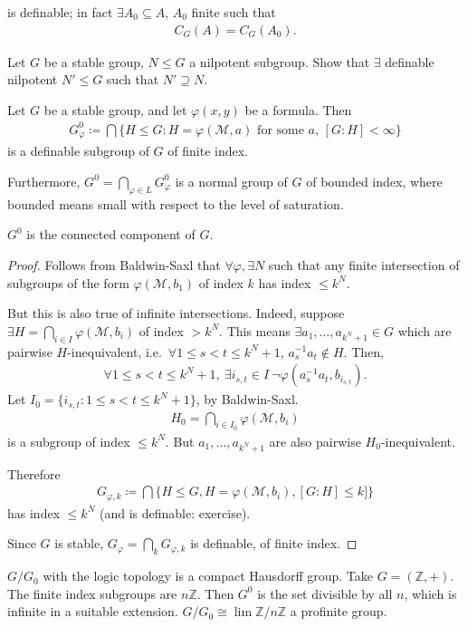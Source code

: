 \documentclass{article}
\begin{document}
is definable; in fact $\exists A_0 \subseteq A$, $A_0$ finite such that
\begin{align*}
  C_G(A) = C_G(A_0).
\end{align*}
\begin{ex}
  Let $G$ be a stable group, $N \leq G$ a nilpotent subgroup. Show that $\exists$ definable nilpotent $N' \leq G$ such that $N' \supseteq N$.
\end{ex}
\begin{cor}
  Let $G$ be a stable group, and let $\varphi(x,y)$ be a formula.
  Then
  \begin{align*}
    G_\varphi^0 \coloneqq \bigcap \{H \leq G : H = \varphi(\mathcal{M},a)\text{ for some $a$, $[G:H] < \infty$}\}
  \end{align*}
  is a definable subgroup of $G$ of finite index.

  Furthermore, $G^0 = \bigcap_{\varphi \in L} G_\varphi^0$ is a normal group of $G$ of bounded index, where bounded means small with respect to the level of saturation.

  $G^0$ is the connected component of $G$.
\end{cor}
\begin{proof}
  Follows from Baldwin-Saxl that $\forall \varphi, \exists N$ such that any finite intersection of subgroups of the form $\varphi(\mathcal{M},b_1)$ of index $k$ has index $\leq k^N$.

  But this is also true of infinite intersections.
  Indeed, suppose $\exists H = \bigcap_{i \in I} \varphi(\mathcal{M},b_i)$ of index $> k^N$.
  This means $\exists a_1, \dotsc, a_{k^N + 1} \in G$ which are pairwise $H$-inequivalent, i.e.\ $\forall 1 \leq s < t \leq k^N + 1$, $a_s^{-1} a_t \notin H$.
  Then,
  \begin{align*}
    \forall 1 \leq s < t \leq k^N + 1,\ \exists i_{s,t} \in I \ \neg\varphi(a_s^{-1} a_t, b_{i_{s,t}}).
  \end{align*}
  Let $I_0 = \{i_{s,t} : 1 \leq s < t \leq k^N + 1\}$, by Baldwin-Saxl.
  \begin{align*}
    H_0 = \bigcap_{i \in I_0} \varphi(\mathcal{M},b_i)
  \end{align*}
  is a subgroup of index $\leq k^N$.
  But $a_1, \dotsc, a_{k^N + 1}$ are also pairwise $H_0$-inequivalent.

  Therefore
  \begin{align*}
    G_{\varphi,k} \coloneqq \bigcap \{H \leq G, H = \varphi(\mathcal{M},b_i), [G:H] \leq k]\}
  \end{align*}
  has index $\leq k^N$ (and is definable: exercise).

  Since $G$ is stable,
  $G_\varphi = \bigcap_k G_{\varphi,k}$ is definable, of finite index.
\end{proof}
$G/G_0$ with the logic topology is a compact Hausdorff group.
Take $G = (\mathbb{Z},+)$. The finite index subgroups are $n \mathbb{Z}$. Then $G^0$ is the set divisible by all $n$, which is infinite in a suitable extension.
$G/G_0 \cong \lim \mathbb{Z}/n\mathbb{Z}$ %
a profinite group.
\end{document}
